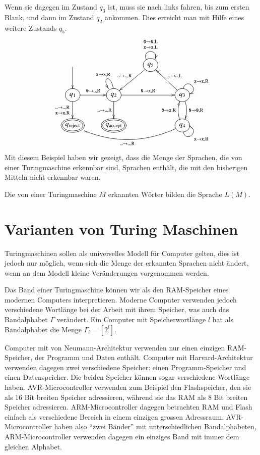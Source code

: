 Wenn sie dagegen im Zustand $q_3$ ist, muss sie nach links fahren,
bis zum ersten Blank, und dann im Zustand $q_2$ ankommen. Dies erreicht
man mit Hilfe eines weitere Zustands $q_5$.
\[
\entrymodifiers={++[o][F]}
\xymatrix{
*+\txt{}\ar[d]
	&*+\txt{}
		&{q_5}\ar@(ul,ur)^{\genfrac{}{}{0pt}{1}{\texttt{0}\to \texttt{0},\text{L}}{{\tt x}\to {\tt x},\text{L}}}
		      \ar[dl]_{\blank\to\blank,\text{R}}
\\
{q_1}\ar[d]_{\genfrac{}{}{0pt}{1}{\blank\to\blank,\text{R}}{{\tt x}\to{\tt x},\text{R}}}
	\ar[r]^{\texttt{0}\to\blank,\text{R}}
	&{q_2}\ar[d]_{\blank\to\blank,\text{R}}
	      \ar[rr]^{\texttt{0}\to{\tt x},\text{R}}
              \ar@(u,ul)_{{\tt x}\to {\tt x},\text{R}}
		&*+\txt{}
			&{q_3}\ar@(u,r)^{{\tt x}\to{\tt x},\text{R}}
			      \ar@/^/[d]^{\texttt{0}\to \texttt{0},\text{R}}
			      \ar[ul]_{\blank\to\blank,\text{L}}
\\
*++[o][F=]{q_\text{reject}}
	&*++[o][F=]{q_\text{accept}}
		&*+\txt{}
			&{q_4}\ar@/^/[u]^{\texttt{0}\to {\tt x},\text{R}}
			      \ar@(d,r)_{{\tt x}\to{\tt x},\text{R}}
			      \ar@/^20pt/[lll]^{\blank\to\blank,\text{R}}
}
\]
Mit diesem Beispiel haben wir gezeigt, dass die Menge der
Sprachen, die von einer Turingmaschine erkennbar sind, Sprachen
enthält, die mit den bisherigen Mitteln nicht erkennbar waren.

\begin{definition}
Die von einer Turingmaschine $M$ erkannten Wörter bilden die
Sprache $L(M)$.
\end{definition}

\section{Varianten von Turing Maschinen}
Turingmaschinen sollen als universelles Modell für Computer gelten,
dies ist jedoch nur möglich, wenn sich die Menge der erkannten Sprachen
nicht ändert, wenn an dem Modell kleine Veränderungen vorgenommen
werden.

Das Band einer Turingmaschine können wir als den RAM-Speicher
eines modernen Computers interpretieren. Moderne Computer verwenden
jedoch verschiedene Wortlänge bei der Arbeit mit ihrem Speicher,
was auch das Bandalphabet $\Gamma$ verändert. Ein Computer mit
Speicherwortlänge $l$ hat als Bandalphabet die Menge $\Gamma_l=[2^l]$.

Computer mit von Neumann-Architektur verwenden nur einen einzigen RAM-Speicher,
der Programm und Daten enthält. Computer mit Harvard-Architektur
verwenden dagegen zwei verschiedene Speicher: einen Programm-Speicher
und einen Datenspeicher. Die beiden Speicher können sogar verschiedene
Wortlänge haben. AVR-Microcontroller verwenden zum Beispiel
den Flashspeicher, den sie als 16 Bit breiten Speicher adressieren,
während sie das RAM als 8 Bit breiten Speicher adressieren.
ARM-Microcontroller dagegen betrachten RAM und Flash einfach als
verschiedene Bereich in einem einzigen grossen Adressraum.
AVR-Microcontroller haben also ``zwei Bänder'' mit unterschiedlichen
Bandalphabeten, ARM-Microcontroller verwenden dagegen ein einziges Band
mit immer dem gleichen Alphabet.

